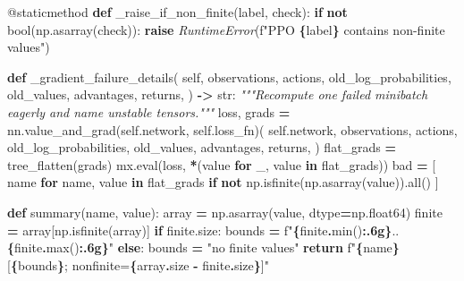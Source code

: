 \documentclass[
  chinese,
  11pt,
  letterpaper,
]{article}
\newenvironment{Shaded}{\begin{snugshade}}{\end{snugshade}}
\newcommand{\AttributeTok}[1]{\textcolor[rgb]{0.13,0.29,0.53}{#1}}
\newcommand{\BuiltInTok}[1]{#1}
\newcommand{\CommentTok}[1]{\textcolor[rgb]{0.56,0.35,0.01}{\textit{#1}}}
\newcommand{\ControlFlowTok}[1]{\textcolor[rgb]{0.13,0.29,0.53}{\textbf{#1}}}
\newcommand{\KeywordTok}[1]{\textcolor[rgb]{0.13,0.29,0.53}{\textbf{#1}}}
\newcommand{\NormalTok}[1]{#1}
\newcommand{\OperatorTok}[1]{\textcolor[rgb]{0.81,0.36,0.00}{\textbf{#1}}}
\newcommand{\PreprocessorTok}[1]{\textcolor[rgb]{0.56,0.35,0.01}{\textit{#1}}}
\newcommand{\SpecialCharTok}[1]{\textcolor[rgb]{0.81,0.36,0.00}{\textbf{#1}}}
\newcommand{\SpecialStringTok}[1]{\textcolor[rgb]{0.31,0.60,0.02}{#1}}
\newcommand{\StringTok}[1]{\textcolor[rgb]{0.31,0.60,0.02}{#1}}
\newcommand{\VariableTok}[1]{\textcolor[rgb]{0.00,0.00,0.00}{#1}}
\renewenvironment{Shaded}{\par\smallskip}{\par\smallskip}
\begin{document}
\begin{Shaded}
\begin{Highlighting}[]
    \AttributeTok{@staticmethod}
    \KeywordTok{def}\NormalTok{ \_raise\_if\_non\_finite(label, check):}
        \ControlFlowTok{if} \KeywordTok{not} \BuiltInTok{bool}\NormalTok{(np.asarray(check)):}
            \ControlFlowTok{raise} \PreprocessorTok{RuntimeError}\NormalTok{(}\SpecialStringTok{f"PPO }\SpecialCharTok{\{}\NormalTok{label}\SpecialCharTok{\}}\SpecialStringTok{ contains non{-}finite values"}\NormalTok{)}

    \KeywordTok{def}\NormalTok{ \_gradient\_failure\_details(}
        \VariableTok{self}\NormalTok{,}
\NormalTok{        observations,}
\NormalTok{        actions,}
\NormalTok{        old\_log\_probabilities,}
\NormalTok{        old\_values,}
\NormalTok{        advantages,}
\NormalTok{        returns,}
\NormalTok{    ) }\OperatorTok{{-}\textgreater{}} \BuiltInTok{str}\NormalTok{:}
        \CommentTok{"""Recompute one failed minibatch eagerly and name unstable tensors."""}
\NormalTok{        loss, grads }\OperatorTok{=}\NormalTok{ nn.value\_and\_grad(}\VariableTok{self}\NormalTok{.network, }\VariableTok{self}\NormalTok{.loss\_fn)(}
            \VariableTok{self}\NormalTok{.network,}
\NormalTok{            observations,}
\NormalTok{            actions,}
\NormalTok{            old\_log\_probabilities,}
\NormalTok{            old\_values,}
\NormalTok{            advantages,}
\NormalTok{            returns,}
\NormalTok{        )}
\NormalTok{        flat\_grads }\OperatorTok{=}\NormalTok{ tree\_flatten(grads)}
\NormalTok{        mx.}\BuiltInTok{eval}\NormalTok{(loss, }\OperatorTok{*}\NormalTok{(value }\ControlFlowTok{for}\NormalTok{ \_, value }\KeywordTok{in}\NormalTok{ flat\_grads))}
\NormalTok{        bad }\OperatorTok{=}\NormalTok{ [}
\NormalTok{            name }\ControlFlowTok{for}\NormalTok{ name, value }\KeywordTok{in}\NormalTok{ flat\_grads}
            \ControlFlowTok{if} \KeywordTok{not}\NormalTok{ np.isfinite(np.asarray(value)).}\BuiltInTok{all}\NormalTok{()}
\NormalTok{        ]}

        \KeywordTok{def}\NormalTok{ summary(name, value):}
\NormalTok{            array }\OperatorTok{=}\NormalTok{ np.asarray(value, dtype}\OperatorTok{=}\NormalTok{np.float64)}
\NormalTok{            finite }\OperatorTok{=}\NormalTok{ array[np.isfinite(array)]}
            \ControlFlowTok{if}\NormalTok{ finite.size:}
\NormalTok{                bounds }\OperatorTok{=} \SpecialStringTok{f"}\SpecialCharTok{\{}\NormalTok{finite}\SpecialCharTok{.}\BuiltInTok{min}\NormalTok{()}\SpecialCharTok{:.6g\}}\SpecialStringTok{..}\SpecialCharTok{\{}\NormalTok{finite}\SpecialCharTok{.}\BuiltInTok{max}\NormalTok{()}\SpecialCharTok{:.6g\}}\SpecialStringTok{"}
            \ControlFlowTok{else}\NormalTok{:}
\NormalTok{                bounds }\OperatorTok{=} \StringTok{"no finite values"}
            \ControlFlowTok{return} \SpecialStringTok{f"}\SpecialCharTok{\{}\NormalTok{name}\SpecialCharTok{\}}\SpecialStringTok{[}\SpecialCharTok{\{}\NormalTok{bounds}\SpecialCharTok{\}}\SpecialStringTok{; nonfinite=}\SpecialCharTok{\{}\NormalTok{array}\SpecialCharTok{.}\NormalTok{size }\OperatorTok{{-}}\NormalTok{ finite}\SpecialCharTok{.}\NormalTok{size}\SpecialCharTok{\}}\SpecialStringTok{]"}


\end{Highlighting}
\end{Shaded}
\end{document}
